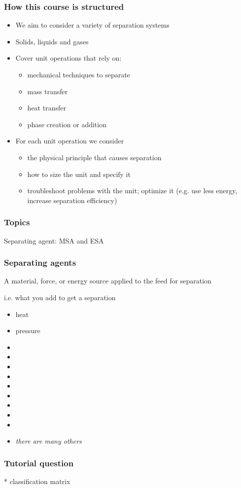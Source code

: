 \begin{frame}\frametitle{How this course is structured}
	\begin{itemize}
		\item	We aim to consider a variety of separation systems
		\item	Solids, liquids and gases
		\item	Cover unit operations that rely on:
		\begin{itemize}
			\item	mechanical techniques to separate
			\item	mass transfer
			\item	heat transfer
			\item	phase creation or addition
		\end{itemize}
		\item	For each unit operation we consider
		\begin{itemize}
			\item	the physical principle that causes separation
			\item	how to size the unit and specify it
			\item	troubleshoot problems with the unit; optimize it (e.g. use less energy, increase separation efficiency)
			
		\end{itemize}
	\end{itemize}
\end{frame}

\begin{frame}\frametitle{Topics}
	Separating agent: MSA and ESA
\end{frame}

\begin{frame}\frametitle{Separating agents}	
	\begin{exampleblock}
		{A material, force, or energy source applied to the feed for separation }
	\end{exampleblock}
	\vspace{12pt}
	i.e. what you add to get a separation
	\vspace{12pt}
	\begin{itemize}
		\item	heat
		\item	pressure
		\item	\iftoggle{instructor}{vacuum}{}
		\item	\iftoggle{instructor}{membrane}{}
		\item	\iftoggle{instructor}{filter media}{}
		\item	\iftoggle{instructor}{electric field}{}
		\item	\iftoggle{instructor}{flow}{}
		\item	\iftoggle{instructor}{temperature gradient}{}
		\item	\iftoggle{instructor}{concentration gradient}{}
		\item	\iftoggle{instructor}{gravitational field}{}
		\item	\iftoggle{instructor}{adsorbent}{}
		\item	\emph{there are many others}
	\end{itemize}
\end{frame}

\begin{frame}\frametitle{Tutorial question}
	* classification matrix
	
	
	
\end{frame}


